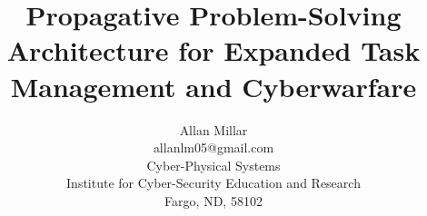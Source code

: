 \pagestyle{empty}
\setlength{\textheight}{8.75in}
\setlength{\columnsep}{2.0pc}
\setlength{\textwidth}{6.8in}
\setlength{\footheight}{0.0in}
\setlength{\topmargin}{0.25in}
\setlength{\headheight}{0.0in}
\setlength{\headsep}{0.0in}
\setlength{\oddsidemargin}{-.19in}
\setlength{\parindent}{1pc}
\setlength\paperheight {279.4mm}%
\setlength\paperwidth  {210mm}%

\makeatletter
\def\@normalsize{\@setsize\normalsize{10pt}\xpt\@xpt
\abovedisplayskip 10pt plus2pt minus5pt\belowdisplayskip
\abovedisplayskip \abovedisplayshortskip \z@
plus3pt\belowdisplayshortskip 6pt plus3pt
minus3pt\let\@listi\@listI}
\def\subsize{\@setsize\subsize{12pt}\xipt\@xipt}
\def\section{\@startsection {section}{1}{\z@}{1.0ex plus
1ex minus .2ex}{.2ex plus .2ex}{\large\bf}}
\def\subsection{\@startsection {subsection}{2}{\z@}{.2ex
plus 1ex} {.2ex plus .2ex}{\subsize\bf}}
\makeatother

\date{}
\title{\Large\bf Propagative Problem-Solving Architecture for Expanded Task Management and Cyberwarfare}

\author{Allan Millar \\
	allanlm05@gmail.com \\
	Cyber-Physical Systems \\
	Institute for Cyber-Security Education and Research \\
	Fargo, ND, 58102}

\maketitle
\thispagestyle{empty}
